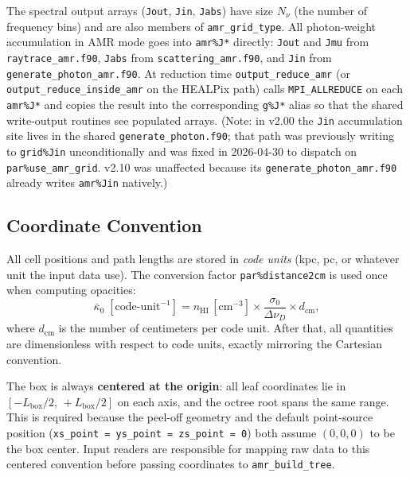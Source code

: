 \documentclass[english,a4paper]{my_memo}
\begin{document}
\begin{sloppypar}
The spectral output arrays (\texttt{Jout}, \texttt{Jin}, \texttt{Jabs}) have
size $N_\nu$ (the number of frequency bins) and are also members of
\texttt{amr\_grid\_type}.  All photon-weight accumulation in AMR mode
goes into \texttt{amr\%J*} directly: \texttt{Jout} and \texttt{Jmu}
from \texttt{raytrace\_amr.f90}, \texttt{Jabs} from
\texttt{scattering\_amr.f90}, and \texttt{Jin} from
\texttt{generate\_photon\_amr.f90}.  At reduction time
\texttt{output\_reduce\_amr} (or \texttt{output\_reduce\_inside\_amr}
on the HEALPix path) calls \texttt{MPI\_ALLREDUCE} on each
\texttt{amr\%J*} and copies the result into the corresponding
\texttt{g\%J*} alias so that the shared write-output routines see
populated arrays.  (Note: in v2.00 the \texttt{Jin} accumulation site
lives in the shared \texttt{generate\_photon.f90}; that path was
previously writing to \texttt{grid\%Jin} unconditionally and was
fixed in 2026-04-30 to dispatch on \texttt{par\%use\_amr\_grid}.
v2.10 was unaffected because its \texttt{generate\_photon\_amr.f90}
already writes \texttt{amr\%Jin} natively.)
\end{sloppypar}

\subsection{Coordinate Convention}

All cell positions and path lengths are stored in \emph{code units} (kpc, pc, or
whatever unit the input data use).  The conversion factor
\texttt{par\%distance2cm} is used once when computing opacities:
\begin{equation}
  \bar\kappa_0 \;[\mathrm{code\text{-}unit}^{-1}]
    = n_\mathrm{HI}\,[\mathrm{cm}^{-3}]
      \times \frac{\sigma_0}{\Delta\nu_D}
      \times d_\mathrm{cm},
\end{equation}
where $d_\mathrm{cm}$ is the number of centimeters per code unit.  After that,
all quantities are dimensionless with respect to code units, exactly mirroring
the Cartesian convention.

The box is always \textbf{centered at the origin}: all leaf coordinates lie in
$[-L_\mathrm{box}/2,\,+L_\mathrm{box}/2]$ on each axis, and the octree root
spans the same range.  This is required because the peel-off geometry and the
default point-source position (\texttt{xs\_point = ys\_point = zs\_point = 0})
both assume $(0,0,0)$ to be the box center.  Input readers are responsible for
mapping raw data to this centered convention before passing coordinates to
\texttt{amr\_build\_tree}.
\end{document}
